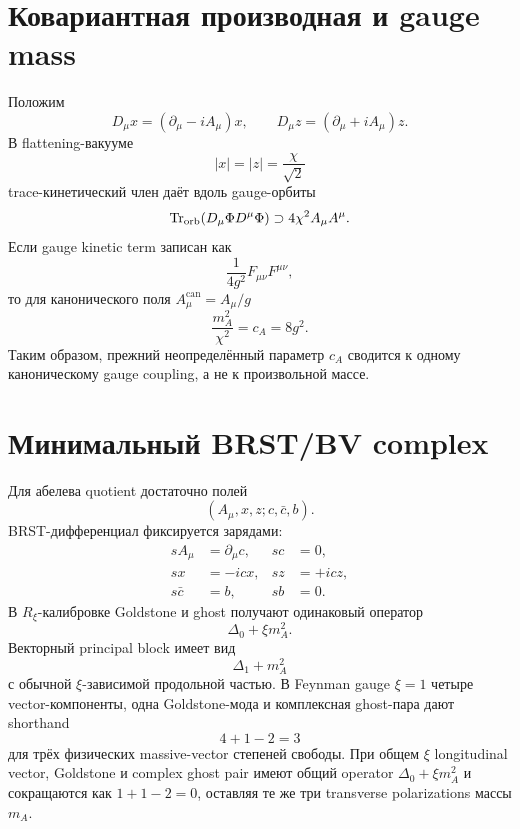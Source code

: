 \section{Ковариантная производная и gauge mass}

Положим
\begin{equation}
 D_\mu x=(\partial_\mu-iA_\mu)x,
 \qquad
 D_\mu z=(\partial_\mu+iA_\mu)z.
\end{equation}
В flattening-вакууме
\begin{equation}
 |x|=|z|=\frac{\chi}{\sqrt2}
\end{equation}
trace-кинетический член даёт вдоль gauge-орбиты
\begin{equation}
 \operatorname{Tr}_{\mathrm{orb}}(D_\mu\Phi D^\mu\Phi)
 \supset4\chi^2 A_\mu A^\mu.
\end{equation}
Если gauge kinetic term записан как
\begin{equation}
 \frac1{4g^2}F_{\mu\nu}F^{\mu\nu},
\end{equation}
то для канонического поля \(A_\mu^{\mathrm{can}}=A_\mu/g\)
\begin{equation}
 \frac{m_A^2}{\chi^2}=c_A=8g^2.
\end{equation}
Таким образом, прежний неопределённый параметр \(c_A\) сводится к одному
каноническому gauge coupling, а не к произвольной массе.

\section{Минимальный BRST/BV complex}

Для абелева quotient достаточно полей
\begin{equation}
 (A_\mu,x,z;c,\bar c,b).
\end{equation}
BRST-дифференциал фиксируется зарядами:
\begin{align}
 sA_\mu&=\partial_\mu c,
 & sc&=0,
 \\
 sx&=-icx,
 & sz&=+icz,
 \\
 s\bar c&=b,
 & sb&=0.
\end{align}
В \(R_\xi\)-калибровке Goldstone и ghost получают одинаковый оператор
\begin{equation}
 \Delta_0+\xi m_A^2.
\end{equation}
Векторный principal block имеет вид
\begin{equation}
 \Delta_1+m_A^2
\end{equation}
с обычной \(\xi\)-зависимой продольной частью. В Feynman gauge
\(\xi=1\) четыре vector-компоненты, одна Goldstone-мода и комплексная
ghost-пара дают shorthand
\begin{equation}
 4+1-2=3
\end{equation}
для трёх физических massive-vector степеней свободы. При общем \(\xi\)
longitudinal vector, Goldstone и complex ghost pair имеют общий operator
\(\Delta_0+\xi m_A^2\) и сокращаются как
\(1+1-2=0\), оставляя те же три transverse polarizations массы \(m_A\).

